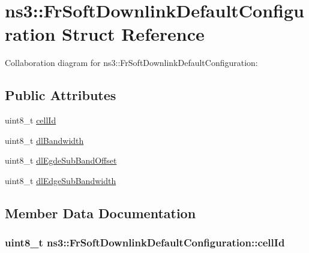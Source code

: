 \hypertarget{structns3_1_1FrSoftDownlinkDefaultConfiguration}{}\section{ns3\+:\+:Fr\+Soft\+Downlink\+Default\+Configuration Struct Reference}
\label{structns3_1_1FrSoftDownlinkDefaultConfiguration}


Collaboration diagram for ns3\+:\+:Fr\+Soft\+Downlink\+Default\+Configuration\+:
\subsection*{Public Attributes}
\begin{DoxyCompactItemize}
\item 
uint8\+\_\+t \hyperlink{structns3_1_1FrSoftDownlinkDefaultConfiguration_a9561ee44bc4e81c301742585790b3079}{cell\+Id}
\item 
uint8\+\_\+t \hyperlink{structns3_1_1FrSoftDownlinkDefaultConfiguration_ab5ccbe7db849400f48e884ca67b53bae}{dl\+Bandwidth}
\item 
uint8\+\_\+t \hyperlink{structns3_1_1FrSoftDownlinkDefaultConfiguration_a39a12b071ac232cead3f3596baad2b02}{dl\+Egde\+Sub\+Band\+Offset}
\item 
uint8\+\_\+t \hyperlink{structns3_1_1FrSoftDownlinkDefaultConfiguration_a9d17002d8b64cd841a9d225d56188987}{dl\+Edge\+Sub\+Bandwidth}
\end{DoxyCompactItemize}


\subsection{Member Data Documentation}
\subsubsection[{\texorpdfstring{cell\+Id}{cellId}}]{\setlength{\rightskip}{0pt plus 5cm}uint8\+\_\+t ns3\+::\+Fr\+Soft\+Downlink\+Default\+Configuration\+::cell\+Id}\hypertarget{structns3_1_1FrSoftDownlinkDefaultConfiguration_a9561ee44bc4e81c301742585790b3079}{}\label{structns3_1_1FrSoftDownlinkDefaultConfiguration_a9561ee44bc4e81c301742585790b3079}

